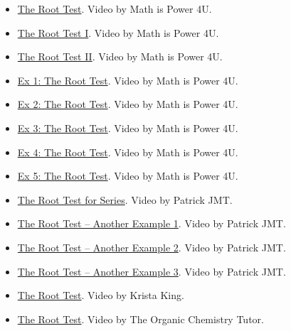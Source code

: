 \begin{itemize}

\item \href{https://www.youtube.com/watch?v=ZE5Pj7s9PWg}{The Root Test}. 
Video by Math is Power 4U.

\item \href{https://www.youtube.com/watch?v=eHzBsFxBzpA}{The Root Test I}. 
Video by Math is Power 4U.

\item \href{https://www.youtube.com/watch?v=eMMtyG7hIyI}{The Root Test II}. 
Video by Math is Power 4U.

\item \href{https://www.youtube.com/watch?v=yVva1LwaE9c}{Ex 1: The Root Test}. 
Video by Math is Power 4U.

\item \href{https://www.youtube.com/watch?v=oKUfBJF5XTI}{Ex 2: The Root Test}. 
Video by Math is Power 4U.

\item \href{https://www.youtube.com/watch?v=Xxzs4sa_zZg}{Ex 3: The Root Test}. 
Video by Math is Power 4U.

\item \href{https://www.youtube.com/watch?v=5HLqCSEgaFI}{Ex 4: The Root Test}. 
Video by Math is Power 4U.

\item \href{https://www.youtube.com/watch?v=JEDrZfwsW1M}{Ex 5: The Root Test}. 
Video by Math is Power 4U.

\item \href{https://www.youtube.com/watch?v=vDdDLfIya0I}{The Root Test for Series}. 
Video by Patrick JMT.

\item \href{https://www.youtube.com/watch?v=nTfJCbqHyxI}{The Root Test – Another Example 1}. 
Video by Patrick JMT.

\item \href{https://www.youtube.com/watch?v=s2ox6IuKiX0}{The Root Test – Another Example 2}. 
Video by Patrick JMT.

\item \href{https://www.youtube.com/watch?v=wo4c4NYIiIo}{The Root Test – Another Example 3}. 
Video by Patrick JMT.

\item \href{https://www.youtube.com/watch?v=pSvQaiqTajk}{The Root Test}. 
Video by Krista King.

\item \href{https://www.youtube.com/watch?v=ahf0eXOll1M}{The Root Test}. 
Video by The Organic Chemistry Tutor.

\end{itemize}

